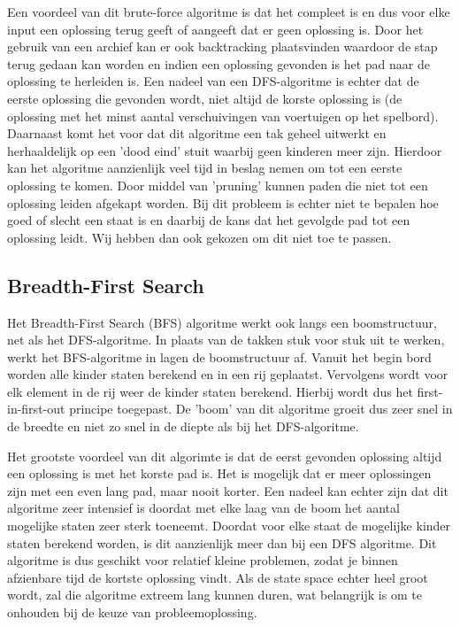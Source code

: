 \documentclass[a4paper]{article}
\begin{document}
    Een voordeel van dit brute-force algoritme is dat het compleet is en dus voor elke input een oplossing terug geeft of aangeeft dat er geen oplossing is. Door het gebruik van een archief kan er ook backtracking plaatsvinden waardoor de stap terug gedaan kan worden en indien een oplossing gevonden is het pad naar de oplossing te herleiden is.  Een nadeel van een DFS-algoritme is echter dat de eerste oplossing die gevonden wordt, niet altijd de korste oplossing is (de oplossing met het minst aantal verschuivingen van voertuigen op het spelbord). Daarnaast komt het voor dat dit algoritme een tak geheel uitwerkt en herhaaldelijk op een 'dood eind' stuit waarbij geen kinderen meer zijn. Hierdoor kan het algoritme aanzienlijk veel tijd in beslag nemen om tot een eerste oplossing te komen. Door middel van 'pruning' kunnen paden die niet tot een oplossing leiden afgekapt worden. Bij dit probleem is echter niet te bepalen hoe goed of slecht een staat is en daarbij de kans dat het gevolgde pad tot een oplossing leidt. Wij hebben dan ook gekozen om dit niet toe te passen.
	
\subsection{Breadth-First Search}
Het Breadth-First Search (BFS) algoritme werkt ook langs een boomstructuur, net als het DFS-algoritme. In plaats van de takken stuk voor stuk uit te werken, werkt het BFS-algoritme in lagen de boomstructuur af. Vanuit het begin bord worden alle kinder staten berekend en in een rij geplaatst. Vervolgens wordt voor elk element in de rij weer de kinder staten berekend. Hierbij wordt dus het first-in-first-out principe toegepast. De 'boom' van dit algoritme groeit dus zeer snel in de breedte en niet zo snel in de diepte als bij het DFS-algoritme. 
	
    Het grootste voordeel van dit algorimte is dat de eerst gevonden oplossing altijd een oplossing is met het korste pad is. Het is mogelijk dat er meer oplossingen zijn met een even lang pad, maar nooit korter. Een nadeel kan echter zijn dat dit algoritme zeer intensief is doordat met elke laag van de boom het aantal mogelijke staten zeer sterk toeneemt. Doordat voor elke staat de mogelijke kinder staten berekend worden, is dit aanzienlijk meer dan bij een DFS algoritme. Dit algoritme is dus geschikt voor relatief kleine problemen, zodat je binnen afzienbare tijd de kortste oplossing vindt. Als de state space echter heel groot wordt, zal die algoritme extreem lang kunnen duren, wat belangrijk is om te onhouden bij de keuze van probleemoplossing.
\end{document}
